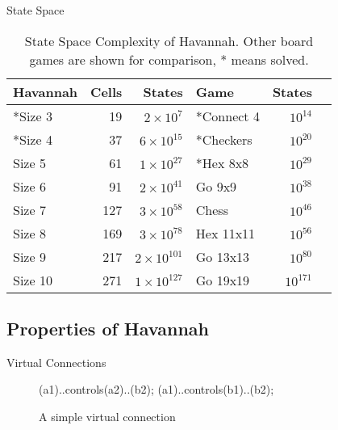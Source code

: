 \documentclass{beamer} %
\begin{document}
\begin{frame}{State Space}
\begin{table}
	\centering
	\begin{tabular}{lrr|lrc}
	Havannah  & Cells & States              & Game       & States     \\ \hline
	*Size 3   &    19 & $2 \times 10^{7}$   & *Connect 4 & $10^{14}$  \\
	*Size 4   &    37 & $6 \times 10^{15}$  & *Checkers  & $10^{20}$  \\
	Size 5    &    61 & $1 \times 10^{27}$  & *Hex 8x8   & $10^{29}$  \\
	Size 6    &    91 & $2 \times 10^{41}$  & Go 9x9     & $10^{38}$  \\
	Size 7    &   127 & $3 \times 10^{58}$  & Chess      & $10^{46}$  \\
	Size 8    &   169 & $3 \times 10^{78}$  & Hex 11x11  & $10^{56}$  \\
	Size 9    &   217 & $2 \times 10^{101}$ & Go 13x13   & $10^{80}$  \\
	Size 10   &   271 & $1 \times 10^{127}$ & Go 19x19   & $10^{171}$ \\
	\end{tabular}
	\caption[State Space Complexity of Havannah]{State Space Complexity of Havannah. Other board games are shown for comparison, * means solved.}
	\label{table:complexity}
\end{table}
\end{frame}

\subsection{Properties of Havannah}



\begin{frame}{Virtual Connections}
\begin{figure}
	\centering
	\begin{HexBoard}[board size=2,show coordinates=false,show hexes=true]
	 (a1)..controls(a2)..(b2);
	 (a1)..controls(b1)..(b2);
	\end{HexBoard}
	\caption{A simple virtual connection}
\end{figure}
\end{frame}
\end{document}
